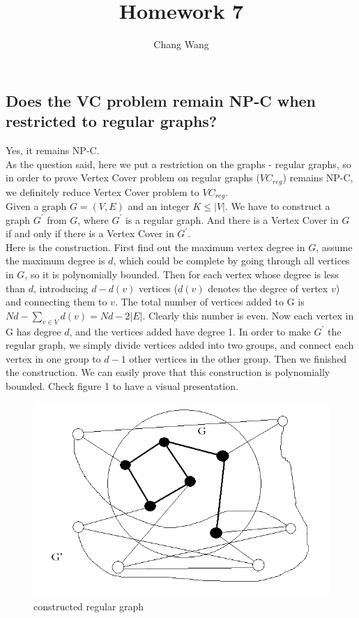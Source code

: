 \documentclass[12pt]{report}
\title{Homework 7}
\author{Chang Wang}
\begin{document}
\maketitle

\subsection{Does the VC problem remain NP-C when restricted to regular graphs?}
Yes, it remains NP-C.\\
As the question said, here we put a restriction on the graphs - regular graphs, so in order to prove Vertex Cover problem on regular graphs ($VC_{reg}$) remains NP-C, we definitely reduce Vertex Cover problem to $VC_{reg}$. \\
Given a graph $G=(V,E)$ and an integer $K \le |V|$. We have to construct a graph $G^{'}$ from $G$, where $G^{'}$ is a regular graph. And there is a Vertex Cover in $G$ if and only if there is a Vertex Cover in $G^{'}$. \\
Here is the construction. First find out the maximum vertex degree in $G$, assume the maximum degree is $d$, which could be complete by going through all vertices in $G$, so it is polynomially bounded. Then for each vertex whose degree is less than $d$, introducing $d - d(v)$ vertices ($d(v)$ denotes the degree of vertex $v$) and connecting them to $v$. The total number of vertices added to G is $Nd - \sum_{v \in V}d(v) = Nd - 2|E|$. Clearly this number is even. Now each vertex in G has degree $d$, and the vertices added have degree 1. In order to make $G^{'}$ the regular graph, we simply divide vertices added into two groups, and connect each vertex in one group to $d - 1$ other vertices in the other group. Then we finished the construction. We can easily prove that this construction is polynomially bounded. Check figure 1 to have a visual presentation.\\
\begin{figure}[h!]
\begin{center}
\includegraphics[scale=0.5]{regular.png}
\caption{constructed regular graph}
\end{center}
\end{figure}
\end{document}
